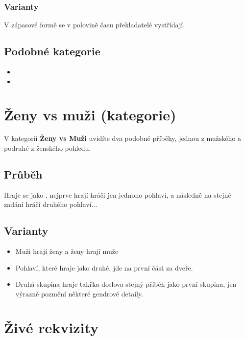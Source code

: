 \documentclass[main.tex]{subfiles}
\begin{document}
\subsubsection{ Varianty } V zápasové formě se v polovině času překladatelé vystřídají. 
 
\subsection{ Podobné kategorie } \begin{itemize}
\item  {}
\item  {}
\end{itemize}
 
 
 
 
\needspace{5cm} \section{Ženy vs muži (kategorie)} \label{ženy vs muži (kategorie)}  
 
 
 
V kategorii \textbf{Ženy vs Muži}{} uvidíte dva podobné příběhy, jednou z mužského a podruhé z ženského pohledu. 
 
 
\subsection{Průběh} Hraje se jako , nejprve hrají hráči jen jednoho pohlaví, a následně na stejné zadání hráči druhého pohlaví... 
 
\subsection{ Varianty } \begin{itemize}
\item  Muži hrají ženy a ženy hrají muže
\item  Pohlaví, které hraje jako druhé, jde na první část za dveře.
\item  Druhá skupina hraje takřka doslova stejný příběh jako první skupina, jen výrazně pozmění některé gendrové detaily.
\end{itemize}
 
 
 
 
\needspace{5cm} \section{Živé rekvizity} \label{živé rekvizity}  
 
\end{document}

